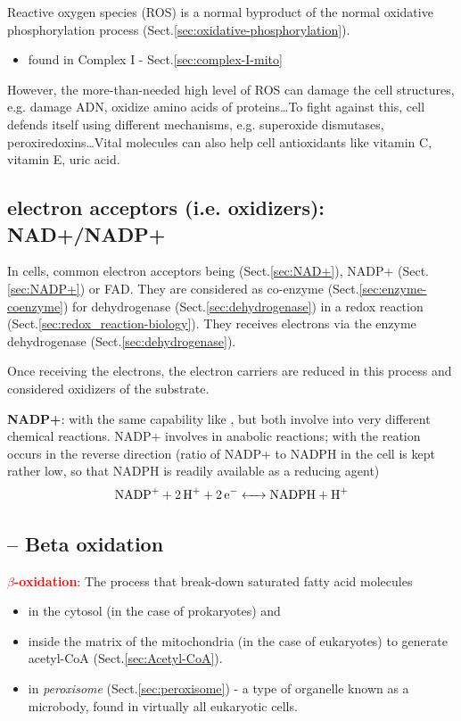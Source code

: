Reactive oxygen species (ROS) is a normal byproduct of the normal oxidative
phosphorylation process (Sect.\ref{sec:oxidative-phosphorylation}).
\begin{itemize}
  \item found in Complex I - Sect.\ref{sec:complex-I-mito}
\end{itemize}

However, the
more-than-needed high level of ROS can damage the cell structures, e.g. damage
ADN, oxidize amino acids of proteins\ldots To fight against this, cell defends
itself using different mechanisms, e.g. superoxide dismutases,
peroxiredoxins\ldots Vital molecules can also help cell antioxidants like
vitamin C, vitamin E, uric acid.

\subsection{electron acceptors (i.e. oxidizers): NAD+/NADP+}
\label{sec:electron-acceptor}

In cells, common electron acceptors being  (Sect.\ref{sec:NAD+}),
NADP+ (Sect.\ref{sec:NADP+}) or FAD. They are considered as co-enzyme
(Sect.\ref{sec:enzyme-coenzyme}) for dehydrogenase (Sect.\ref{sec:dehydrogenase}) in a redox reaction
(Sect.\ref{sec:redox_reaction-biology}).
They receives electrons via the enzyme dehydrogenase
(Sect.\ref{sec:dehydrogenase}).

Once receiving the electrons, the electron carriers are reduced in this process
and considered oxidizers of the substrate.



{\bf NADP+}: with the same capability like , but both involve into very
different chemical reactions. NADP+ involves in anabolic reactions; with the
reation occurs in the reverse direction (ratio of NADP+ to NADPH in the cell is
kept rather low, so that NADPH is readily available as a reducing agent)
\begin{equation}
\ce{NADP+ + 2H+ + 2e- <-> NADPH + H+}
\end{equation}



\subsection{-- Beta oxidation}
\label{sec:beta-oxidation}

\textcolor{red}{\bf $\beta$-oxidation}: The process that break-down
saturated fatty acid molecules
\begin{itemize}
  \item in the cytosol (in the case of
prokaryotes) and

  \item inside the matrix of the mitochondria (in the case of eukaryotes) to
  generate acetyl-CoA (Sect.\ref{sec:Acetyl-CoA}).

  \item in {\it peroxisome} (Sect.\ref{sec:peroxisome}) -  a type of organelle
  known as a microbody, found in virtually all eukaryotic cells.
\end{itemize}

